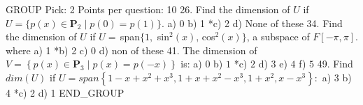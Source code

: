 GROUP
Pick: 2
Points per question: 10
26. Find the dimension of $U$ if $U=\{p(x)\in\mathbf{P}_{2}\mid p(0)=p(1)\}$. %
a)  0
b)  1
*c) 2
d)  None of these
34. Find the dimension of $U$ if $U=\,$span$\{1,$ sin$^{2} (x),\,$cos$^{2}(x)\}$, a subspace of $F[-\pi,\pi]$. where %
a)  1
*b) 2
c)  0
d)  non of these
41. The dimension of $V=\left\{  p(x)\in\mathbf{P}_{3}\mid p(x)=p(-x)\right\}$ is: %
a)  $0$
b)  $1$
*c) $2$
d)  $3$
e)  $4$
f)  $5$
49. Find $dim(U)$ if $U=span\left\{  1-x+x^{2}+x^{3},1+x+x^{2}-x^{3},1+x^{2},x-x^{3}\right\}  :$ %
a)  3
b)  4
*c) 2
d)  1
END_GROUP

